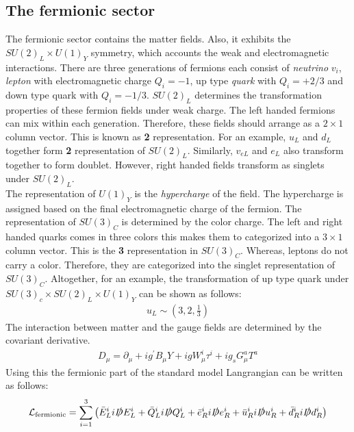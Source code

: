 \subsection{The fermionic sector}
The fermionic sector contains the matter fields. Also, it exhibits the $SU(2)_L\times U(1)_Y$ symmetry, which accounts the weak and electromagnetic  interactions. There are three generations of fermions each consist of \textit{neutrino} $v_i$, \textit{lepton} with electromagnetic charge $Q_i=-1$, up type \textit{quark} with $Q_i=+2/3$ and down type quark with $Q_i=-1/3$. $SU(2)_L$ determines the transformation properties of these fermion fields under weak charge. The left handed fermions can mix within each generation. Therefore, these fields should arrange as a $2\times 1$ column vector. This is known as \textbf{2} representation. For an example, $u_L$ and $d_L$ together form \textbf{2} representation of $SU(2)_L$. Similarly, $v_{eL}$ and $e_L$ also transform together to form doublet. However, right handed fields transform as singlets under $SU(2)_L$.\\
The representation of $U(1)_Y$ is the \textit{hypercharge} of the field. The hypercharge is assigned based on the final electromagnetic charge of the fermion. The representation of $SU(3)_C$ is determined by the color charge. The left and right handed quarks comes in three colors this makes them to categorized into a $3\times 1$ column vector. This is the \textbf{3} representation in $SU(3)_C$. Whereas, leptons do not carry a color. Therefore, they are categorized into the singlet representation of $SU(3)_C$.
Altogether, for an example, the transformation of up type quark under $SU(3)_c\times SU(2)_L\times U(1)_Y$ can be shown as follows:
\begin{eqnarray}
u_L\sim (3,2,\frac{1}{3})
\end{eqnarray}
The interaction between matter and the gauge fields are determined by the covariant derivative.
\begin{eqnarray}
D_{\mu}=\partial_{\mu}+i g^{\prime} B_{\mu} Y+i g W_{\mu}^{i} \tau^{i}+i g_{s} G_{\mu}^{a} T^{a}
\end{eqnarray} 
Using this the fermionic part of the standard model Langrangian can be written as follows:
\begin{eqnarray}
\mathcal{L}_{\text{fermionic}}=\sum_{i=1}^{3}\left(\bar{E}^i_L i \slashed{D}E_{L}^i+\bar{Q}_{L}^i i\slashed{D}Q_L^i+\bar{e}_R^i i\slashed{D}e_{R}^i+\bar{u}_R^i i\slashed{D}u_R^i+\bar{d}_R^i i\slashed{D}d_R^i\right)
\end{eqnarray}
